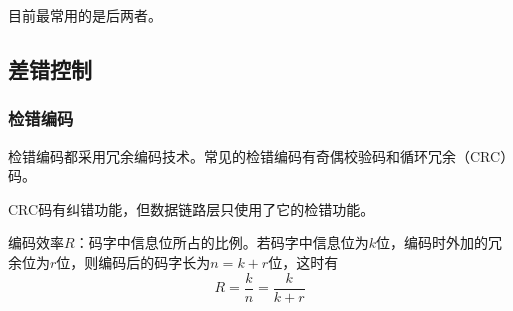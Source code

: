\documentclass[12pt, a4paper, oneside]{ctexart}
\begin{document}
目前最常用的是后两者。

\subsection{差错控制}

\subsubsection{检错编码}

检错编码都采用冗余编码技术。常见的检错编码有奇偶校验码和循环冗余（CRC）码。

CRC码有纠错功能，但数据链路层只使用了它的检错功能。

编码效率$R$：码字中信息位所占的比例。若码字中信息位为$k$位，编码时外加的冗余位为$r$位，则编码后的码字长为$n=k+r$位，这时有
\begin{equation*}
    R=\frac{k}{n}=\frac{k}{k+r}
\end{equation*}
\end{document}
